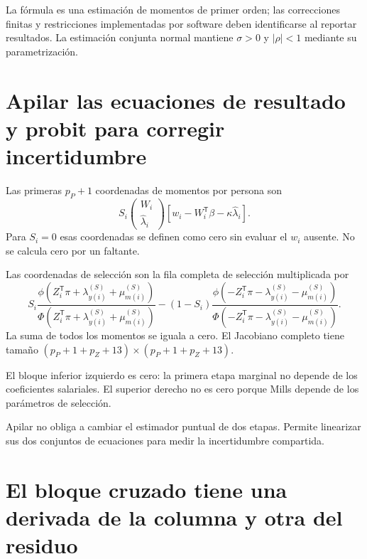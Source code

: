 \documentclass[11pt,a4paper]{article}
\newcommand{\abs}[1]{\left\lvert #1\right\rvert}
\begin{document}
La fórmula es una estimación de momentos de primer orden; las correcciones finitas y restricciones implementadas por software deben identificarse al reportar resultados. La estimación conjunta normal mantiene $\sigma>0$ y $\abs\rho<1$ mediante su parametrización.

\clearpage
\section{Apilar las ecuaciones de resultado y probit para corregir incertidumbre}

Las primeras $p_P+1$ coordenadas de momentos por persona son
\[
S_i
\begin{pmatrix}W_i\\\widehat\lambda_i\end{pmatrix}
\left[w_i-W_i^{\mathsf T}\beta-\kappa\widehat\lambda_i\right].
\]
Para $S_i=0$ esas coordenadas se definen como cero sin evaluar el $w_i$ ausente. No se calcula cero por un faltante.

Las coordenadas de selección son la fila completa de selección multiplicada por
\[
S_i\frac{\phi(Z_i^{\mathsf T}\pi+\lambda_{y(i)}^{(S)}+\mu_{m(i)}^{(S)})}
{\Phi(Z_i^{\mathsf T}\pi+\lambda_{y(i)}^{(S)}+\mu_{m(i)}^{(S)})}
-(1-S_i)
\frac{\phi(-Z_i^{\mathsf T}\pi-\lambda_{y(i)}^{(S)}-\mu_{m(i)}^{(S)})}
{\Phi(-Z_i^{\mathsf T}\pi-\lambda_{y(i)}^{(S)}-\mu_{m(i)}^{(S)})}.
\]
La suma de todos los momentos se iguala a cero. El Jacobiano completo tiene tamaño
$(p_P+1+p_Z+13)\times(p_P+1+p_Z+13)$.

El bloque inferior izquierdo es cero: la primera etapa marginal no depende de los coeficientes salariales. El superior derecho no es cero porque Mills depende de los parámetros de selección.

Apilar no obliga a cambiar el estimador puntual de dos etapas. Permite linearizar sus dos conjuntos de ecuaciones para medir la incertidumbre compartida.

\clearpage
\section{El bloque cruzado tiene una derivada de la columna y otra del residuo}
\end{document}
